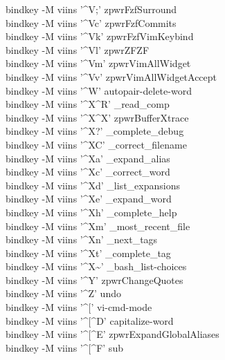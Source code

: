 \documentclass[11pt,a4paper,twoside]{book}
\begin{document}
bindkey -M viins '\textasciicircum{}V;' zpwrFzfSurround\\
bindkey -M viins '\textasciicircum{}Vc' zpwrFzfCommits\\
bindkey -M viins '\textasciicircum{}Vk' zpwrFzfVimKeybind\\
bindkey -M viins '\textasciicircum{}Vl' zpwrZFZF\\
bindkey -M viins '\textasciicircum{}Vm' zpwrVimAllWidget\\
bindkey -M viins '\textasciicircum{}Vv' zpwrVimAllWidgetAccept\\
bindkey -M viins '\textasciicircum{}W' autopair-delete-word\\
bindkey -M viins '\textasciicircum{}X\textasciicircum{}R' \_read\_comp\\
bindkey -M viins '\textasciicircum{}X\textasciicircum{}X' zpwrBufferXtrace\\
bindkey -M viins '\textasciicircum{}X?' \_complete\_debug\\
bindkey -M viins '\textasciicircum{}XC' \_correct\_filename\\
bindkey -M viins '\textasciicircum{}Xa' \_expand\_alias\\
bindkey -M viins '\textasciicircum{}Xc' \_correct\_word\\
bindkey -M viins '\textasciicircum{}Xd' \_list\_expansions\\
bindkey -M viins '\textasciicircum{}Xe' \_expand\_word\\
bindkey -M viins '\textasciicircum{}Xh' \_complete\_help\\
bindkey -M viins '\textasciicircum{}Xm' \_most\_recent\_file\\
bindkey -M viins '\textasciicircum{}Xn' \_next\_tags\\
bindkey -M viins '\textasciicircum{}Xt' \_complete\_tag\\
bindkey -M viins '\textasciicircum{}X\textasciitilde{}' \_bash\_list-choices\\
bindkey -M viins '\textasciicircum{}Y' zpwrChangeQuotes\\
bindkey -M viins '\textasciicircum{}Z' undo\\
bindkey -M viins '\textasciicircum{}[' vi-cmd-mode\\
bindkey -M viins '\textasciicircum{}[\textasciicircum{}D' capitalize-word\\
bindkey -M viins '\textasciicircum{}[\textasciicircum{}E' zpwrExpandGlobalAliases\\
bindkey -M viins '\textasciicircum{}[\textasciicircum{}F' sub\\
\end{document}

